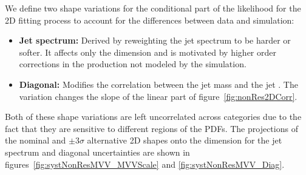 We define two shape variations for the conditional part of the likelihood for the 2D fitting process to account for the differences between data and simulation:
\begin{itemize}
  \item {\bfseries Jet \pt spectrum:} Derived by reweighting the jet \pt spectrum to be harder or softer.
  It affects only the \MVV dimension and is motivated by higher order corrections in the \Wjets production not modeled by the simulation.
  \item {\bfseries Diagonal:} Modifies the correlation between the jet mass and the jet \pt.
  The variation changes the slope of the linear part of figure~\ref{fig:nonRes2DCorr}.
\end{itemize}
Both of these shape variations are left uncorrelated across categories due to the fact that they are sensitive to different regions of the PDFs.
The projections of the nominal and $\pm3\sigma$ alternative 2D shapes onto the \MVV dimension for the jet \pt spectrum and diagonal uncertainties are shown in figures~\ref{fig:systNonResMVV_MVVScale} and \ref{fig:systNonResMVV_Diag}.

